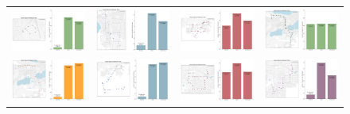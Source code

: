 \documentclass[b4paper]{article}
\begin{document}
\begin{figure}
\begin{center}
\begin{tabular}{ cccc }
  \includegraphics[width=44mm]{Route_36.png}  &   \includegraphics[width=44mm]{Route_39.png}  & \includegraphics[width=44mm]{Route_40.png}  & \includegraphics[width=44mm]{Route_44.png} \\ 

  \includegraphics[width=44mm]{Route_48.png}  &   \includegraphics[width=44mm]{Route_49.png}  & \includegraphics[width=44mm]{Route_50.png}  & \includegraphics[width=44mm]{Route_51.png} \\ 


\end{tabular}
\end{center}
\end{figure}
\end{document}
